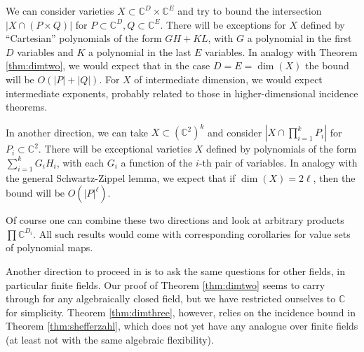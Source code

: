 \documentclass{daj}
\theoremstyle{definition}
\newcommand{\C}{\mathbb C}
\begin{document}
We can consider varieties $X\subset\C^D\times \C^E$ and try to bound the intersection $|X\cap (P\times Q)|$ for $P\subset \C^D, Q\subset \C^E$.
There will be exceptions for $X$ defined by ``Cartesian'' polynomials of the form $GH+KL$, with $G$ a polynomial in the first $D$ variables and $K$ a polynomial in the last $E$ variables.
In analogy with Theorem \ref{thm:dimtwo}, we would expect that in the case $D=E=\dim(X)$ the bound will be $O(|P|+|Q|)$.
For $X$ of intermediate dimension, we would expect intermediate exponents, probably related to those in higher-dimensional incidence theorems.

In another direction, we can take $X\subset (\C^2)^k$ and consider $|X\cap \prod_{i=1}^k P_i|$ for $P_i\subset \C^2$.
There will be exceptional varieties $X$ defined by polynomials of the form $\sum_{i=1}^k G_iH_i$, with each $G_i$ a function of the $i$-th pair of variables.
In analogy with the general Schwartz-Zippel lemma, 
we expect that if $\dim(X)= 2\ell$, then the bound will be $O(|P|^\ell)$.

Of course one can combine these two directions and look at arbitrary products $\prod \C^{D_i}$.
All such results would come with corresponding corollaries for value sets of polynomial maps.


Another direction to proceed in is to ask the same questions for other fields, in particular finite fields.
Our proof of Theorem \ref{thm:dimtwo} seems to carry through for any algebraically closed field, but we have restricted ourselves to $\C$ for simplicity.
Theorem \ref{thm:dimthree}, however, relies on the incidence bound in Theorem \ref{thm:shefferzahl}, 
which does not yet have any analogue over finite fields (at least not with the same algebraic flexibility).





\end{document}
